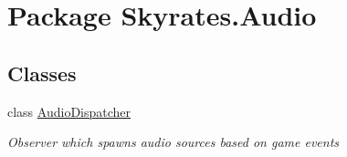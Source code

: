 \hypertarget{namespace_skyrates_1_1_audio}{\section{Package Skyrates.\-Audio}
\label{namespace_skyrates_1_1_audio}
}
\subsection*{Classes}
\begin{DoxyCompactItemize}
\item 
class \hyperlink{class_skyrates_1_1_audio_1_1_audio_dispatcher}{Audio\-Dispatcher}
\begin{DoxyCompactList}\small\item\em Observer which spawns audio sources based on game events \end{DoxyCompactList}\end{DoxyCompactItemize}
